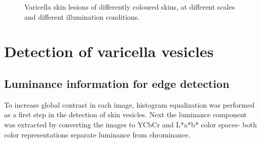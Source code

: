 \documentclass[oribibl]{llncs}
\begin{document}
\begin{figure}
\centering
{}\hspace{2pt}
\hspace{3pt}%
\hspace{3pt}%
\caption{Varicella skin lesions of differently coloured skins, at different scales and different illumination conditions.\label{fig_variacionesdeescala}}
\end{figure}

\section{Detection of varicella vesicles}
\subsection{Luminance information for edge detection}
To increase global contrast in each image, histogram equalization was performed as a first step in the detection of skin vesicles.
Next the luminance component was extracted by converting the images to YCbCr and L*a*b* color spaces- both color representations separate luminance from chrominance.
\end{document}
